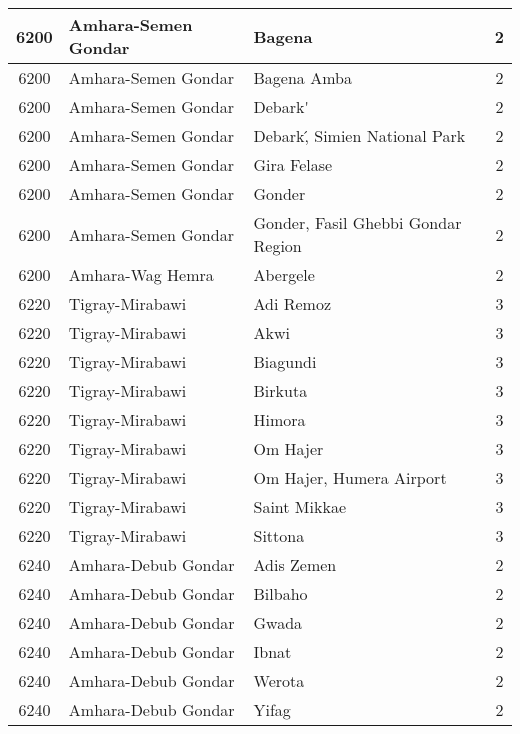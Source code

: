 \documentclass[12pt,a4paper]{report}
\begin{document}
\begin{tabular}{|c|l|l|c|}
\hline 
\rule[-1ex]{0pt}{2.5ex} 6200 & Amhara-Semen Gondar & Bagena & 2 \\
\hline 
\rule[-1ex]{0pt}{2.5ex} 6200 & Amhara-Semen Gondar & Bagena Amba & 2 \\
\hline 
\rule[-1ex]{0pt}{2.5ex} 6200 & Amhara-Semen Gondar & Debark\' & 2 \\
\hline 
\rule[-1ex]{0pt}{2.5ex} 6200 & Amhara-Semen Gondar & Debark\', Simien National Park & 2 \\
\hline 
\rule[-1ex]{0pt}{2.5ex} 6200 & Amhara-Semen Gondar & Gira Felase & 2 \\
\hline 
\rule[-1ex]{0pt}{2.5ex} 6200 & Amhara-Semen Gondar & Gonder & 2 \\
\hline 
\rule[-1ex]{0pt}{2.5ex} 6200 & Amhara-Semen Gondar & Gonder, Fasil Ghebbi Gondar Region & 2 \\
\hline 
\rule[-1ex]{0pt}{2.5ex} 6200 & Amhara-Wag Hemra & Abergele & 2 \\
\hline 
\rule[-1ex]{0pt}{2.5ex} 6220 & Tigray-Mirabawi & Adi Remoz & 3 \\
\hline 
\rule[-1ex]{0pt}{2.5ex} 6220 & Tigray-Mirabawi & Akwi & 3 \\
\hline 
\rule[-1ex]{0pt}{2.5ex} 6220 & Tigray-Mirabawi & Biagundi & 3 \\
\hline 
\rule[-1ex]{0pt}{2.5ex} 6220 & Tigray-Mirabawi & Birkuta & 3 \\
\hline 
\rule[-1ex]{0pt}{2.5ex} 6220 & Tigray-Mirabawi & Himora & 3 \\
\hline 
\rule[-1ex]{0pt}{2.5ex} 6220 & Tigray-Mirabawi & Om Hajer & 3 \\
\hline 
\rule[-1ex]{0pt}{2.5ex} 6220 & Tigray-Mirabawi & Om Hajer, Humera Airport & 3 \\
\hline 
\rule[-1ex]{0pt}{2.5ex} 6220 & Tigray-Mirabawi & Saint Mikkae & 3 \\
\hline 
\rule[-1ex]{0pt}{2.5ex} 6220 & Tigray-Mirabawi & Sittona & 3 \\
\hline 
\rule[-1ex]{0pt}{2.5ex} 6240 & Amhara-Debub Gondar & Adis Zemen & 2 \\
\hline 
\rule[-1ex]{0pt}{2.5ex} 6240 & Amhara-Debub Gondar & Bilbaho & 2 \\
\hline 
\rule[-1ex]{0pt}{2.5ex} 6240 & Amhara-Debub Gondar & Gwada & 2 \\
\hline 
\rule[-1ex]{0pt}{2.5ex} 6240 & Amhara-Debub Gondar & Ibnat & 2 \\
\hline 
\rule[-1ex]{0pt}{2.5ex} 6240 & Amhara-Debub Gondar & Werota & 2 \\
\hline 
\rule[-1ex]{0pt}{2.5ex} 6240 & Amhara-Debub Gondar & Yifag & 2 \\

\end{tabular}
\end{document}
